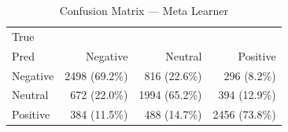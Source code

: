 \begin{table}[htbp]
\centering
\caption{Confusion Matrix — Meta Learner}
\label{tab:cm_meta_learner}
\begin{tabular}{lrrr}
\toprule
True \\ Pred & Negative & Neutral & Positive \\
\midrule
Negative & 2498 (69.2\%) & 816 (22.6\%) & 296 (8.2\%) \\
Neutral & 672 (22.0\%) & 1994 (65.2\%) & 394 (12.9\%) \\
Positive & 384 (11.5\%) & 488 (14.7\%) & 2456 (73.8\%) \\
\bottomrule
\end{tabular}
\end{table}
